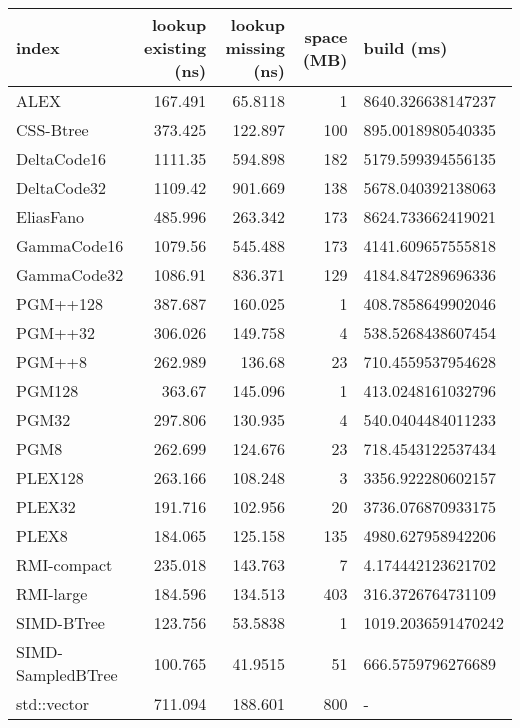 \begin{tabular}{lrrrl}
\hline
 index             &   lookup existing (ns) &   lookup missing (ns) &   space (MB) & build (ms)         \\
\hline
 ALEX              &                167.491 &               65.8118 &            1 & 8640.326638147237  \\
 CSS-Btree         &                373.425 &              122.897  &          100 & 895.0018980540335  \\
 DeltaCode16       &               1111.35  &              594.898  &          182 & 5179.599394556135  \\
 DeltaCode32       &               1109.42  &              901.669  &          138 & 5678.040392138063  \\
 EliasFano         &                485.996 &              263.342  &          173 & 8624.733662419021  \\
 GammaCode16       &               1079.56  &              545.488  &          173 & 4141.609657555818  \\
 GammaCode32       &               1086.91  &              836.371  &          129 & 4184.847289696336  \\
 PGM++128          &                387.687 &              160.025  &            1 & 408.7858649902046  \\
 PGM++32           &                306.026 &              149.758  &            4 & 538.5268438607454  \\
 PGM++8            &                262.989 &              136.68   &           23 & 710.4559537954628  \\
 PGM128            &                363.67  &              145.096  &            1 & 413.0248161032796  \\
 PGM32             &                297.806 &              130.935  &            4 & 540.0404484011233  \\
 PGM8              &                262.699 &              124.676  &           23 & 718.4543122537434  \\
 PLEX128           &                263.166 &              108.248  &            3 & 3356.922280602157  \\
 PLEX32            &                191.716 &              102.956  &           20 & 3736.076870933175  \\
 PLEX8             &                184.065 &              125.158  &          135 & 4980.627958942206  \\
 RMI-compact       &                235.018 &              143.763  &            7 & 4.174442123621702  \\
 RMI-large         &                184.596 &              134.513  &          403 & 316.3726764731109  \\
 SIMD-BTree        &                123.756 &               53.5838 &            1 & 1019.2036591470242 \\
 SIMD-SampledBTree &                100.765 &               41.9515 &           51 & 666.5759796276689  \\
 std::vector       &                711.094 &              188.601  &          800 & -                  \\
\hline
\end{tabular}